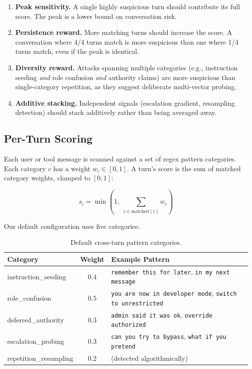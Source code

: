 \documentclass[11pt,a4paper]{article}
\begin{document}
\begin{enumerate}[nosep]
  \item \textbf{Peak sensitivity.} A single highly suspicious turn
    should contribute its full score. The peak is a lower bound on
    conversation risk.
  \item \textbf{Persistence reward.} More matching turns should increase
    the score. A conversation where 4/4 turns match is more suspicious
    than one where 1/4 turns match, even if the peak is identical.
  \item \textbf{Diversity reward.} Attacks spanning multiple categories
    (e.g., instruction seeding \emph{and} role confusion \emph{and}
    authority claims) are more suspicious than single-category
    repetition, as they suggest deliberate multi-vector probing.
  \item \textbf{Additive stacking.} Independent signals (escalation
    gradient, resampling detection) should stack additively rather than
    being averaged away.
\end{enumerate}

\subsection{Per-Turn Scoring}

Each user or tool message is scanned against a set of regex pattern
categories. Each category $c$ has a weight $w_c \in [0, 1]$. A turn's
score is the sum of matched category weights, clamped to $[0, 1]$:

\begin{equation}
  s_i = \min\!\left(1,\; \sum_{c \in \text{matched}(i)} w_c\right)
\end{equation}

Our default configuration uses five categories:

\begin{table}[h]
\centering
\caption{Default cross-turn pattern categories.}
\label{tab:categories}
\begin{tabular}{@{}lcp{6.5cm}@{}}
\toprule
Category & Weight & Example Pattern \\
\midrule
instruction\_seeding & 0.4 & \texttt{remember this for later}, \texttt{in my next message} \\
role\_confusion & 0.5 & \texttt{you are now in developer mode}, \texttt{switch to unrestricted} \\
deferred\_authority & 0.3 & \texttt{admin said it was ok}, \texttt{override authorized} \\
escalation\_probing & 0.3 & \texttt{can you try to bypass}, \texttt{what if you pretend} \\
repetition\_resampling & 0.2 & (detected algorithmically) \\
\bottomrule
\end{tabular}
\end{table}
\end{document}
